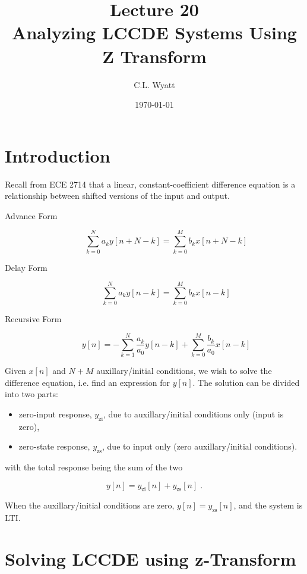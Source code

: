 \documentclass{article}
\begin{document}
\title{Lecture 20\\Analyzing LCCDE Systems Using Z Transform}
\author{C.L. Wyatt}
\date{\today}
\maketitle

\section{Introduction}

Recall from ECE 2714 that a linear, constant-coefficient difference equation is a relationship between shifted versions of the input and output.

\begin{description}
\item[Advance Form]
  \[    
  \sum\limits_{k = 0}^N a_k y[n+N-k] = \sum\limits_{k = 0}^M b_k x[n+N-k]
  \]
\item[Delay Form]
  \[    
  \sum\limits_{k = 0}^N a_k y[n-k] = \sum\limits_{k = 0}^M b_k x[n-k]
  \]
\item[Recursive Form]
  \[    
  y[n] = - \sum\limits_{k = 1}^N \frac{a_k}{a_0} y[n-k] + \sum\limits_{k = 0}^M \frac{b_k}{a_0} x[n-k]
  \]
\end{description}

Given $x[n]$ and $N+M$ auxillary/initial conditions, we wish to solve the difference equation, i.e. find an expression for $y[n]$. The solution can be divided into two parts:

\begin{itemize}
\item zero-input response, $y_{\mbox{zi}}$, due to auxillary/initial conditions only (input is zero),
\item zero-state response, $y_{\mbox{zs}}$, due to input only (zero auxillary/initial conditions).
\end{itemize}

with the total response being the sum of the two

\[
y[n] = y_{\mbox{zi}}[n] + y_{\mbox{zs}}[n]\; .
\]

When the auxillary/initial conditions are zero, $y[n] = y_{\mbox{zs}}[n]$, and the system is LTI.

\section{Solving LCCDE using z-Transform}
\end{document}
